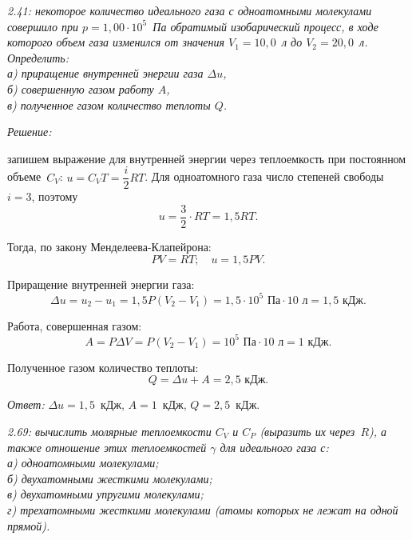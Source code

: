 \documentclass[pscyr]{hedsemwork}
\begin{document}
\maketitle


\emph{2.41: некоторое количество идеального газа с одноатомными молекулами
совершило при \( p = 1,\!00 \cdot 10^5 \)~Па обратимый изобарический процесс, в
ходе которого объем газа изменился от значения \( V_1 = 10,\!0 \)~л до
\( V_2 = 20,\!0 \)~л.\\Определить:\\
а) приращение внутренней энергии газа \( \Delta u \),\\
б) совершенную газом работу \( A \),\\
в) полученное газом количество теплоты \( Q \).}

\vspace*{2em}
\emph{Решение:}

запишем выражение для внутренней энергии через теплоемкость при постоянном
объеме~\( C_V \): \( u = C_V T = \dfrac{i}{2}RT \). Для одноатомного газа число
степеней свободы \( i = 3 \), поэтому
\[
    u = \frac{3}{2} \cdot RT = 1,\!5 RT.
\]

Тогда, по закону Менделеева-Клапейрона:
\[
    PV = RT; \quad u = 1,\!5 PV.
\]

Приращение внутренней энергии газа:
\[
    \Delta u = u_2 - u_1 = 1,\!5 P(V_2 - V_1) = 1,\!5 \cdot 10^5\text{ Па}
    \cdot 10\text{ л} = 1,\!5\text{ кДж}.
\]

Работа, совершенная газом:
\[
    A = P\Delta V = P(V_2 - V_1) = 10^5\text{ Па} \cdot 10\text{ л} =
    1\text{ кДж}.
\]

Полученное газом количество теплоты:
\[
    Q = \Delta u + A = 2,\!5\text{ кДж}.
\]

\vspace*{2em}
\emph{Ответ:} \( \Delta u = 1,\!5 \)~кДж, \( A = 1 \)~кДж, \( Q = 2,\!5 \)~кДж.

\newpage %

\emph{2.69: вычислить молярные теплоемкости \( C_V \) и \( C_P \)
(выразить их через~\( R \)), а также отношение этих теплоемкостей \( \gamma \)
для идеального газа с:\\
а) одноатомными молекулами;\\
б) двухатомными жесткими молекулами;\\
в) двухатомными упругими молекулами;\\
г) трехатомными жесткими молекулами (атомы которых не лежат на одной прямой).}
\end{document}
